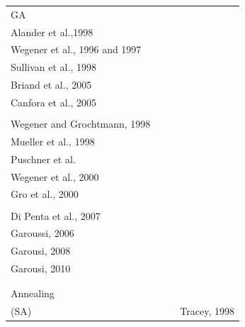 \documentclass{report}
\begin{document}
\begin{table}[h]
\begin{tabular}{p{2.4cm}|p{3.8cm}|p{3.8cm}|p{3.0cm}|}
\begin{minipage}{0.1\textwidth}\small GA \end{minipage}                                                              & \cellcolor[HTML]{FFFFFF} \begin{minipage}{0.3\textwidth}   \small \textnormal{ \\  Alander et al.,1998 \cite{Alander} \\ Wegener et al., 1996 and 1997 \cite{Wegener1997}\cite{J.WegenerK.GrimmM.GrochtmannH.Sthamer1996} \\  Sullivan et al., 1998 \cite{Sullivan} \\ Briand et al., 2005 \cite{Briand2005} \\ Canfora et al., 2005 \cite{Canfora}  \\ }\end{minipage} & \cellcolor[HTML]{FFFFFF} \begin{minipage}{0.3\textwidth} \small \textrm{  \\ Wegener and Grochtmann, 1998 \cite{Wegener1998} \\  Mueller et al., 1998 \cite{Mueller1998} \\ Puschner et al. \cite{Puschner1998} \\ Wegener et al., 2000 \cite{Stations} \\ Gro et al., 2000 \cite{Gross2000}  \\ }\end{minipage}& \cellcolor[HTML]{FFFFFF} \begin{minipage}{0.22\textwidth}   \small \textnormal{ \\  Di Penta et al., 2007 \cite{Penta2007} \\ Garoussi, 2006 \cite{Garousi2006} \\ Garousi, 2008 \cite{Garousi2008} \\ Garousi, 2010 \cite{Garousi2010} \\ } \end{minipage} \\[2ex] \cline{2-4} 
\begin{minipage}{0.1\textwidth}\small Simulated \\ Annealing \\ (SA) \end{minipage}                                                             & \cellcolor[HTML]{FFFFFF} & \cellcolor[HTML]{FFFFFF} & \cellcolor[HTML]{FFFFFF} \begin{minipage}{0.3\textwidth}   \small  Tracey, 1998 \cite{Tracey1998} \end{minipage} \\[2ex] \cline{2-4}

\end{tabular}
\end{table}
\end{document}
